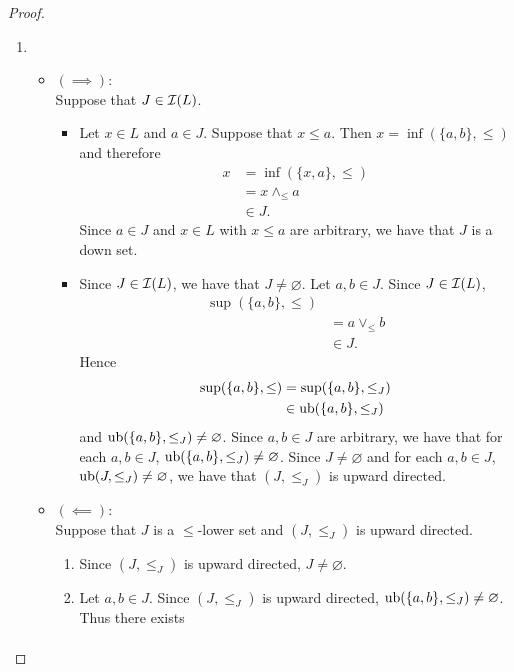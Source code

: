 \documentclass{book}
\begin{document}
	\begin{proof}\
		\begin{enumerate}
			\item 
			\begin{itemize}
				\item $(\implies)$: \\
				Suppose that $J \in \mathcal{I}(L)$.
				\begin{itemize}
					\item Let $x \in L$ and $a \in J$. Suppose that $x \leq a$. Then $x = \inf(\{a,b\}, \leq)$ and therefore
					\begin{align*}
						x
						& = \inf(\{x, a\}, \leq) \\
						& = x \wedge_{\leq} a \\
						& \in J. 
					\end{align*}  
					Since $a \in J$ and $x \in L$ with $x \leq a$ are arbitrary, we have that $J$ is a down set. 
					\item Since $J \in \mathcal{I}(L)$, we have that $J \neq \varnothing$. Let $a, b \in J$. Since $J \in \mathcal{I}(L)$, 
					\begin{align*}
						\sup (\{a,b\}, \leq) \\
						& = a \vee_{\leq} b \\
						& \in J.
					\end{align*}
					Hence   
					\begin{align*}
						\sup (\{a,b\}, \leq)
						& = \sup (\{a,b\}, \leq_J) \\
						& \in \operatorname{ub}(\{a,b\}, \leq_J)
					\end{align*}
					and $\operatorname{ub}(\{a,b\}, \leq_J) \neq \varnothing$.
					Since $a,b \in J$ are arbitrary, we have that for each $a,b \in J$, $\operatorname{ub} (\{a,b\}, \leq_J) \neq \varnothing$. Since $J \neq \varnothing$ and for each $a,b \in J$, $\operatorname{ub}(J, \leq_J) \neq \varnothing$, we have that $(J, \leq_J)$ is upward directed.
				\end{itemize}
				\item $(\impliedby)$: \\
				Suppose that $J$ is a $\leq$-lower set and $(J, \leq_J)$ is upward directed. 
				\begin{enumerate}
					\item Since $(J, \leq_J)$ is upward directed, $J \neq \varnothing$.
					\item Let $a,b \in J$. Since $(J, \leq_J)$ is upward directed, $\operatorname{ub}(\{a,b\}, \leq_J) \neq \varnothing$. Thus there exists  
					\begin{align}

\end{align}
\end{enumerate}
\end{itemize}
\end{enumerate}
\end{proof}
\end{document}
